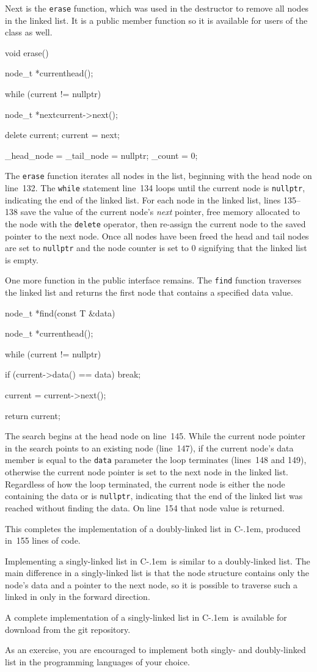 \documentclass{article}
\newcommand{\Cpp}{\mbox{C\kern-.1em\raisebox{.35ex}{\smaller{\smaller{+\kern-0.05em+}}}}}
\begin{document}
  Next is the \verb|erase| function, which was used in the destructor to remove all nodes in the linked list. It is a public member function so it is available for users of the class as well.
  \begin{lstcpp}
  void erase() {
    node_t *current{head()};

    while (current != nullptr) {
      node_t *next{current->next()};

      delete current;
      current = next;
    }

    _head_node = _tail_node = nullptr;
    _count = 0;
  }\end{lstcpp}
  The \verb|erase| function iterates all nodes in the list, beginning with the head node on line~132. The \verb|while| statement line~134 loops until the current node is \verb|nullptr|, indicating the end of the linked list. For each node in the linked list, lines 135--138 save the value of the current node's \emph{next} pointer, free memory allocated to the node with the \verb|delete| operator, then re-assign the current node to the saved pointer to the next node. Once all nodes have been freed the head and tail nodes are set to \verb|nullptr| and the node counter is set to 0 signifying that the linked list is empty.

  One more function in the public interface remains. The \verb|find| function traverses the linked list and returns the first node that contains a specified data value.
  \begin{lstcpp}
  node_t *find(const T &data) {
    node_t *current{head()};

    while (current != nullptr) {
      if (current->data() == data)
        break;

      current = current->next();
    }

    return current;
  }\end{lstcpp}
  The search begins at the head node on line~145. While the current node pointer in the search points to an existing node (line~147), if the current node's data member is equal to the \verb|data| parameter the loop terminates (lines~148 and 149), otherwise the current node pointer is set to the next node in the linked list. Regardless of how the loop terminated, the current node is either the node containing the data or is \verb|nullptr|, indicating that the end of the linked list was reached without finding the data. On line~154 that node value is returned.


  This completes the implementation of a doubly-linked list in \Cpp, produced in~155 lines of code.

  Implementing a singly-linked list in \Cpp\ is similar to a doubly-linked list. The main difference in a singly-linked list is that the node structure contains only the node's data and a pointer to the next node, so it is possible to traverse such a linked in only in the forward direction.

  A complete implementation of a singly-linked list in \Cpp\ is available for download from the git repository.

  As an exercise, you are encouraged to implement both singly- and doubly-linked list in the programming languages of your choice.
\end{document}
